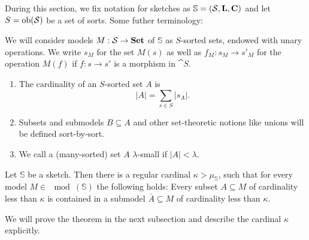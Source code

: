 During this section, we fix notation for sketches as $\mathbb S = (\mathcal{S}, \textbf{L}, \textbf{C})$ and let $S=\textrm{ob}(\mathcal{S})$ be a set of sorts. Some futher terminology:

\begin{Definition}
We will consider models $M : \mathcal{S} \to \mathbf{Set}$ of $\mathbb S$ as $S$-sorted sets, endowed with unary operations. We write $s_M$ for the set $M(s)$ as well as $f_M : s_M \to s'_M$ for the operation $M(f)$ if $f : s \to s'$ is a morphism in $\cat S$.
\begin{enumerate}
\item The cardinality of an $S$-sorted set $A$ is \[ |A| = \sum_{s \in S} |s_A|. \]
\item Subsets and submodels $B \subseteq A$ and other set-theoretic notions like unions will be defined sort-by-sort.
\item We call a (many-sorted) set $A$ $\lambda$-small if $|A|<\lambda$.
\end{enumerate}
\end{Definition}

\begin{Theorem}\label{thm:ls}
Let $\mathbb S$ be a sketch. Then there is a regular cardinal $\kappa > \mu_{\mathbb S}$, such that for every model $M \in \mod(\mathbb S)$ the following holds: Every subset $A \subseteq M$ of cardinality less than $\kappa$ is contained in a submodel $\bar A \subseteq M$ of cardinality less than $\kappa$.
\end{Theorem}
We will prove the theorem in the next subsection and describe the cardinal $\kappa$ explicitly.

